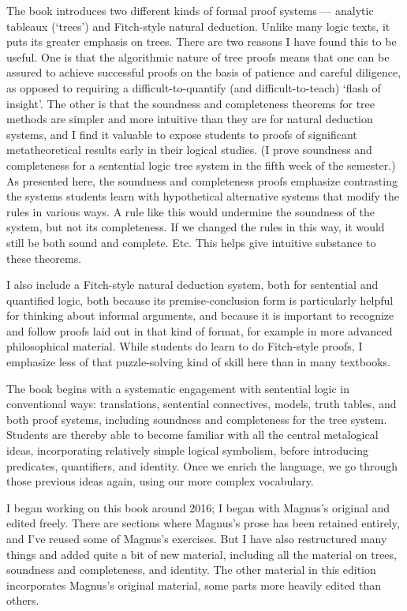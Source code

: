 The book introduces two different kinds of formal proof systems --- analytic tableaux (`trees') and Fitch-style natural deduction. Unlike many logic texts, it puts its greater emphasis on trees. There are two reasons I have found this to be useful. One is that the algorithmic nature of tree proofs means that one can be assured to achieve successful proofs on the basis of patience and careful diligence, as opposed to requiring a difficult-to-quantify (and difficult-to-teach) `flash of insight'. The other is that the soundness and completeness theorems for tree methods are simpler and more intuitive than they are for natural deduction systems, and I find it valuable to expose students to proofs of significant metatheoretical results early in their logical studies. (I prove soundness and completeness for a sentential logic tree system in the fifth week of the semester.) As presented here, the soundness and completeness proofs emphasize contrasting the systems students learn with hypothetical alternative systems that modify the rules in various ways. A rule like this would undermine the soundness of the system, but not its completeness. If we changed the rules in this way, it would still be both sound and complete. Etc. This helps give intuitive substance to these theorems.

I also include a Fitch-style natural deduction system, both for sentential and quantified logic, both because its premise-conclusion form is particularly helpful for thinking about informal arguments, and because it is important to recognize and follow proofs laid out in that kind of format, for example in more advanced philosophical material. While students do learn to do Fitch-style proofs, I emphasize less of that puzzle-solving kind of skill here than in many textbooks.

The book begins with a systematic engagement with sentential logic in conventional ways: translations, sentential connectives, models, truth tables, and both proof systems, including soundness and completeness for the tree system. Students are thereby able to become familiar with all the central metalogical ideas, incorporating relatively simple logical symbolism, before introducing predicates, quantifiers, and identity. Once we enrich the language, we go through those previous ideas again, using our more complex vocabulary.

I began working on this book around 2016; I began with Magnus's original and edited freely. There are sections where Magnus's prose has been retained entirely, and I've reused some of Magnus's exercises. But I have also restructured many things and added quite a bit of new material, including all the material on trees, soundness and completeness, and identity. The other material in this edition incorporates Magnus's original material, some parts more heavily edited than others.


